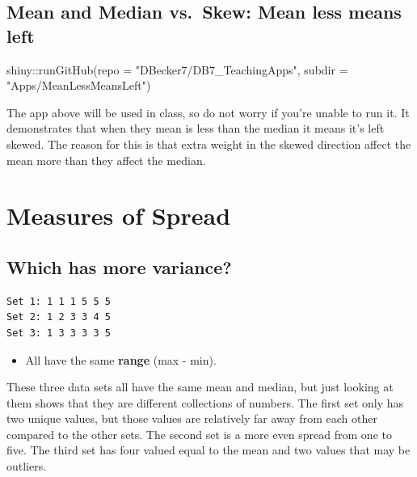 \documentclass[
  letterpaper,
  DIV=11,
  numbers=noendperiod,
  oneside]{scrreprt}
\newenvironment{Shaded}{\begin{snugshade}}{\end{snugshade}}
\newcommand{\AttributeTok}[1]{\textcolor[rgb]{0.40,0.45,0.13}{#1}}
\newcommand{\FunctionTok}[1]{\textcolor[rgb]{0.28,0.35,0.67}{#1}}
\newcommand{\NormalTok}[1]{\textcolor[rgb]{0.00,0.23,0.31}{#1}}
\newcommand{\SpecialCharTok}[1]{\textcolor[rgb]{0.37,0.37,0.37}{#1}}
\newcommand{\StringTok}[1]{\textcolor[rgb]{0.13,0.47,0.30}{#1}}
\providecommand{\tightlist}{%
  \setlength{\itemsep}{0pt}\setlength{\parskip}{0pt}}\usepackage{longtable,booktabs,array}
\begin{document}
\hypertarget{mean-and-median-vs.-skew-mean-less-means-left}{%
\subsection{Mean and Median vs.~Skew: Mean less means
left}\label{mean-and-median-vs.-skew-mean-less-means-left}}

\begin{Shaded}
\begin{Highlighting}[]
\NormalTok{shiny}\SpecialCharTok{::}\FunctionTok{runGitHub}\NormalTok{(}\AttributeTok{repo =} \StringTok{"DBecker7/DB7\_TeachingApps"}\NormalTok{, }
    \AttributeTok{subdir =} \StringTok{"Apps/MeanLessMeansLeft"}\NormalTok{)}
\end{Highlighting}
\end{Shaded}

The app above will be used in class, so do not worry if you're unable to
run it. It demonstrates that when they mean is less than the median it
means it's left skewed. The reason for this is that extra weight in the
skewed direction affect the mean more than they affect the median.

\hypertarget{measures-of-spread}{%
\section{Measures of Spread}\label{measures-of-spread}}

\hypertarget{which-has-more-variance}{%
\subsection{Which has more variance?}\label{which-has-more-variance}}

\begin{verbatim}
Set 1: 1 1 1 5 5 5
Set 2: 1 2 3 3 4 5
Set 3: 1 3 3 3 3 5
\end{verbatim}

\begin{itemize}
\tightlist
\item
  All have the same \textbf{range} (max -
  min).{}
\end{itemize}

These three data sets all have the same mean and median, but just
looking at them shows that they are different collections of numbers.
The first set only has two unique values, but those values are
relatively far away from each other compared to the other sets. The
second set is a more even spread from one to five. The third set has
four valued equal to the mean and two values that may be outliers.
\end{document}
